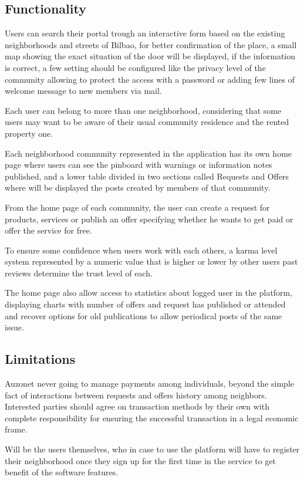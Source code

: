 \documentclass{DeustoFDP}
\begin{document}
\subsection{Functionality}
Users can search their portal trough an interactive form based on the existing neighborhoods and streets of Bilbao, for better confirmation of the place, a small map showing the exact situation of the door will be displayed, if the information is correct, a few setting should be configured like the privacy level of the community allowing to protect the access with a password or adding few lines of welcome message to new members via mail.

Each user can belong to more than one neighborhood, considering that some users may want to be aware of their usual community residence and the rented property one.

Each neighborhood community represented in the application has its own home page where users can see the pinboard with warnings or information notes published, and a lower table divided in two sections called Requests and Offers where will be displayed the posts created by members of that community.

From the home page of each community, the user can create a request for products, services or publish an offer specifying whether he wants to get paid or offer the service for free.

To ensure some confidence when users work with each others, a karma level system represented by a numeric value that is higher or lower by other users past reviews determine the trust level of each.

The home page  also allow access to statistics about logged user in the platform, displaying charts with number of offers and request has published or attended and recover options for old publications to allow periodical posts of the same issue.

\subsection{Limitations}
Auzonet never going to manage payments among individuals, beyond the simple fact of interactions between requests and offers history among neighbors. Interested parties should agree on transaction methods by their own with complete responsibility for ensuring the successful transaction in a legal economic frame.

Will be the users themselves, who in case to use the platform will have to register their neighborhood once they sign up for the first time in the service to get benefit of the software features.
\end{document}

